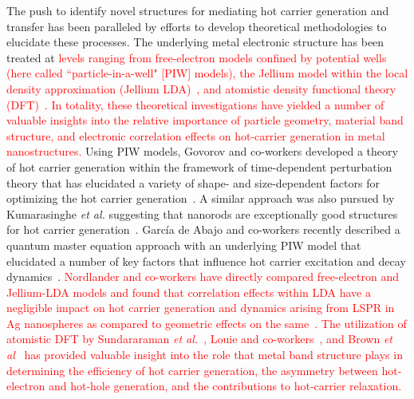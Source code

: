 \documentclass[journal=jpclcd,manuscript=article]{achemso}
\begin{document}
The push to identify novel structures for mediating hot carrier generation and transfer has been paralleled by 
efforts to develop theoretical methodologies to elucidate these processes.  The underlying metal electronic 
structure has been treated at \textcolor{red}{levels ranging from free-electron models confined by 
potential wells~\cite{GZG_JPCC_2013,ZG_JPCC_2014,MLK_ACSNano_2014,KPB_SciRep_2015,SAG_ACSPhotonics_2016} 
(here called ``particle-in-a-well" [PIW] models), the Jellium model within the local density approximation (Jellium LDA)~\cite{MLK_ACSNano_2014},
and atomistic density functional theory (DFT)~\cite{SNJ_NatComm_2014,BMN_NatComm_2015,MWW_NatComm_2015,BSN_ACSNano_2016}.
In totality, these theoretical investigations have yielded a number of valuable insights into 
the relative importance of particle geometry, material band structure, and electronic correlation effects on hot-carrier
generation in metal nanostructures.} 
Using PIW models, Govorov and co-workers developed a theory of 
hot carrier generation within the framework of time-dependent perturbation theory that
has elucidated a variety of shape- and size-dependent factors for optimizing 
the hot carrier generation~\cite{GZG_JPCC_2013,ZG_JPCC_2014}.  A similar approach was also pursued by Kumarasinghe {\it et al.} suggesting
that nanorods are exceptionally good structures for hot carrier generation~\cite{KPB_SciRep_2015}.  Garc\'ia de Abajo and co-workers recently described a 
quantum master equation approach with an underlying PIW model that elucidated a number of key factors that influence
hot carrier excitation and decay dynamics~\cite{SAG_ACSPhotonics_2016}. \textcolor{red}{Nordlander and co-workers have directly 
compared free-electron and Jellium-LDA models and found that correlation effects within LDA have a negligible impact 
on hot carrier generation and dynamics arising from LSPR in Ag nanospheres as compared to geometric effects
on the same~\cite{MLK_ACSNano_2014}.} 
\textcolor{red}{The utilization of atomistic DFT by Sundararaman {\it et al.}~\cite{SNJ_NatComm_2014}, 
Louie and co-workers~\cite{BMN_NatComm_2015}, and Brown {\it et al}~\cite{BSN_ACSNano_2016} 
has provided valuable insight into the role that metal band structure plays
in determining the efficiency of hot carrier generation, the asymmetry between hot-electron
and hot-hole generation, and the contributions to hot-carrier relaxation.}
\end{document}
